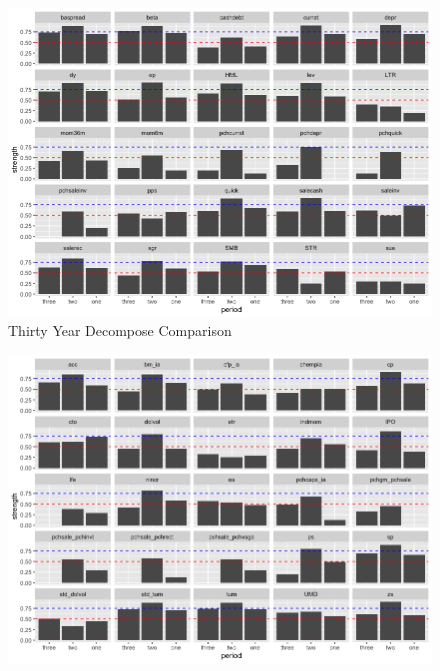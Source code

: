\begin{landscape}
	\begin{figure}[ht]
		\centering
		\caption{Thirty Year Decompose Comparison}\label{figure:thirty_decompose}
		\includegraphics[scale = 0.75]{thirty_decompose_I}
	\end{figure}
\end{landscape}


\begin{landscape}
	\begin{figure}[ht]
		\includegraphics[scale = 0.75]{thirty_decompose_II}
		\centering
	\end{figure}
\end{landscape}

